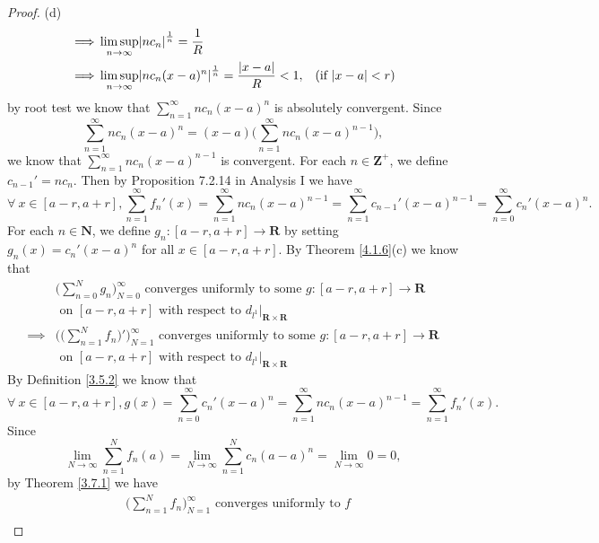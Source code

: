 \begin{proof}{(d)}
\begin{align*}
        \implies & \limsup_{n \to \infty} \abs*{n c_n}^{\frac{1}{n}} = \frac{1}{R}                                                                                                            \\
        \implies & \limsup_{n \to \infty} \abs*{n c_n (x - a)^n}^{\frac{1}{n}} = \frac{\abs*{x - a}}{R} < 1,                                & \text{(if \(\abs*{x - a} < r\))}
    \end{align*}
    by root test we know that \(\sum_{n = 1}^\infty n c_n (x - a)^n\) is absolutely convergent.
    Since
    \[
        \sum_{n = 1}^\infty n c_n (x - a)^n = (x - a) \bigg(\sum_{n = 1}^\infty n c_n (x - a)^{n - 1}\bigg),
    \]
    we know that \(\sum_{n = 1}^\infty n c_n (x - a)^{n - 1}\) is convergent.
    For each \(n \in \mathbf{Z}^+\), we define \(c_{n - 1}' = n c_n\).
    Then by Proposition 7.2.14 in Analysis I we have
    \[
        \forall\ x \in [a - r, a + r], \sum_{n = 1}^\infty f_n'(x) = \sum_{n = 1}^\infty n c_n (x - a)^{n - 1} = \sum_{n = 1}^\infty c_{n - 1}' (x - a)^{n - 1} = \sum_{n = 0}^\infty c_n' (x - a)^n.
    \]
    For each \(n \in \mathbf{N}\), we define \(g_n : [a - r, a + r] \to \mathbf{R}\) by setting \(g_n(x) = c_n' (x - a)^n\) for all \(x \in [a - r, a + r]\).
    By Theorem \ref{4.1.6}(c) we know that
    \begin{align*}
                 & \bigg(\sum_{n = 0}^N g_n\bigg)_{N = 0}^\infty \text{ converges uniformly to some } g : [a - r, a + r] \to \mathbf{R}              \\
                 & \text{ on } [a - r, a + r] \text{ with respect to } d_{l^1}|_{\mathbf{R} \times \mathbf{R}}                                       \\
        \implies & \Bigg(\bigg(\sum_{n = 1}^N f_n\bigg)'\Bigg)_{N = 1}^\infty \text{ converges uniformly to some } g : [a - r, a + r] \to \mathbf{R} \\
                 & \text{ on } [a - r, a + r] \text{ with respect to } d_{l^1}|_{\mathbf{R} \times \mathbf{R}}
    \end{align*}
    By Definition \ref{3.5.2} we know that
    \[
        \forall\ x \in [a - r, a + r], g(x) = \sum_{n = 0}^\infty c_n' (x - a)^n = \sum_{n = 1}^\infty n c_n (x - a)^{n - 1} = \sum_{n = 1}^\infty f_n'(x).
    \]
    Since
    \[
        \lim_{N \to \infty} \sum_{n = 1}^N f_n(a) = \lim_{N \to \infty} \sum_{n = 1}^N c_n (a - a)^n = \lim_{N \to \infty} 0 = 0,
    \]
    by Theorem \ref{3.7.1} we have
    \begin{align*}
         & \bigg(\sum_{n = 1}^N f_n\bigg)_{N = 1}^\infty \text{ converges uniformly to } f             \\

\end{align*}
\end{proof}
